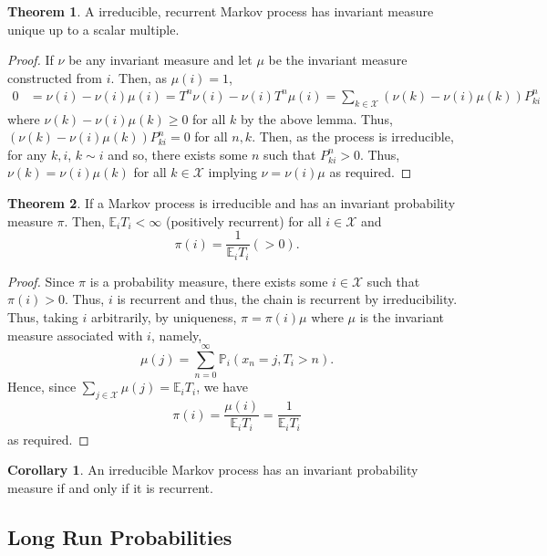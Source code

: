 \documentclass[]{article}
\theoremstyle{definition}
\newtheorem{theorem}{Theorem}
\newtheorem{corollary}{Corollary}[theorem]
\theoremstyle{definition}
\begin{document}
\begin{theorem}
  A irreducible, recurrent Markov process has invariant measure unique up to a scalar multiple.
\end{theorem}
\begin{proof}
  If \(\nu\) be any invariant measure and let \(\mu\) be the invariant measure 
  constructed from \(i\). Then, as \(\mu(i) = 1\),
  \[\begin{split}
    0 & = \nu(i) - \nu(i)\mu(i) = T^n \nu(i) - \nu(i)T^n\mu(i)
       = \sum_{k \in \mathcal{X}} (\nu(k) - \nu(i) \mu(k)) P^n_{ki}
  \end{split}\]
  where \(\nu(k) - \nu(i) \mu(k) \ge 0\) for all \(k\) by the above lemma.
  Thus, \((\nu(k) - \nu(i) \mu(k)) P^n_{ki} = 0\) for all \(n, k\). Then, 
  as the process is irreducible, for any \(k, i\), \(k \sim i\) and so, there 
  exists some \(n\) such that \(P^n_{ki} > 0\). Thus, \(\nu(k) = \nu(i)\mu(k)\) 
  for all \(k \in \mathcal{X}\) implying \(\nu = \nu(i)\mu\) as required. 
\end{proof}

\begin{theorem}
  If a Markov process is irreducible and has an invariant probability measure \(\pi\). 
  Then, \(\mathbb{E}_iT_i < \infty\) (positively recurrent) for all \(i \in \mathcal{X}\) and 
  \[\pi(i) = \frac{1}{\mathbb{E}_i T_i} (> 0).\]
\end{theorem}
\begin{proof}
  Since \(\pi\) is a probability measure, there exists some \(i \in \mathcal{X}\) 
  such that \(\pi(i) > 0\). Thus, \(i\) is recurrent and thus, the chain is recurrent 
  by irreducibility. Thus, taking \(i\) arbitrarily, by uniqueness, 
  \(\pi = \pi(i) \mu\) where \(\mu\) is 
  the invariant measure associated with \(i\), namely, 
  \[\mu(j) = \sum_{n = 0}^\infty \mathbb{P}_i(x_n = j, T_i > n).\]
  Hence, since \(\sum_{j \in \mathcal{X}} \mu(j) = \mathbb{E}_i T_i\), we have 
  \[\pi(i) = \frac{\mu(i)}{\mathbb{E}_i T_i} = \frac{1}{\mathbb{E}_i T_i}\]
  as required.
\end{proof}

\begin{corollary}
  An irreducible Markov process has an invariant probability measure if and only if 
  it is recurrent.
\end{corollary}

\subsection{Long Run Probabilities}
\end{document}
